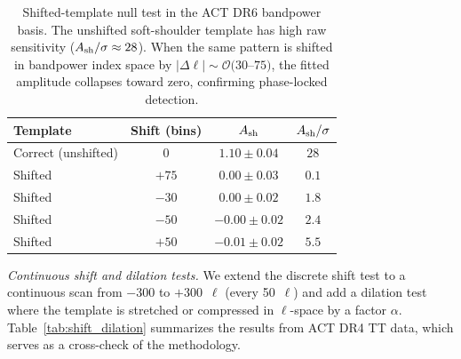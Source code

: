 \documentclass[twocolumn,showpacs,preprintnumbers,amsmath,amssymb,prd]{revtex4-2}
\begin{document}
\begin{table}[t]
\centering
\begin{tabular}{lccc}
\hline\hline
Template           & Shift (bins) & $A_{\rm sh}$       & $A_{\rm sh}/\sigma$ \\
\hline
Correct (unshifted) & $0$         & $1.10 \pm 0.04$    & $28$ \\
Shifted             & $+75$       & $0.00 \pm 0.03$    & $0.1$ \\
Shifted             & $-30$       & $0.00 \pm 0.02$    & $1.8$ \\
Shifted             & $-50$       & $-0.00 \pm 0.02$   & $2.4$ \\
Shifted             & $+50$       & $-0.01 \pm 0.02$   & $5.5$ \\
\hline\hline
\end{tabular}
\caption{Shifted-template null test in the ACT DR6 bandpower basis. The
unshifted soft-shoulder template has high raw sensitivity ($A_{\rm sh}/\sigma \approx 28$). 
When the same pattern is shifted in bandpower index space by $|\Delta\ell| \sim
\mathcal{O}(30$--$75)$, the fitted amplitude collapses toward zero,
confirming phase-locked detection.}
\label{tab:shifted}
\end{table}

\emph{Continuous shift and dilation tests.} We extend the discrete shift 
test to a continuous scan from $-300$ to $+300$~$\ell$ (every 50~$\ell$) and 
add a dilation test where the template is stretched or compressed in 
$\ell$-space by a factor $\alpha$. Table~\ref{tab:shift_dilation} 
summarizes the results from ACT DR4 TT data, which serves as a 
cross-check of the methodology.
\end{document}
